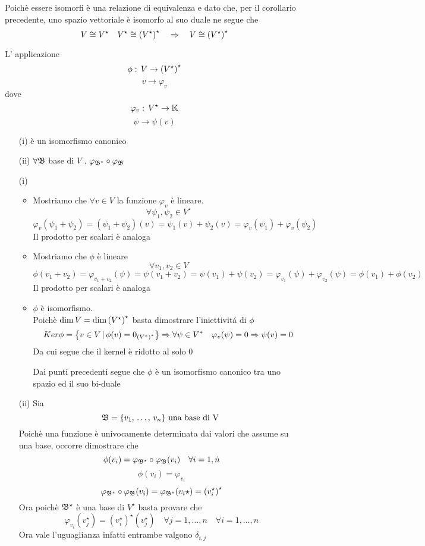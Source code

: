 \begin{oss} Poich\`e essere isomorfi \`e una relazione di equivalenza e dato che, per il corollario precedente, uno spazio vettoriale \`e isomorfo al suo duale ne segue che 
$$ V \cong V^\star  \quad V^\star \cong \left( V^\star \right)^\star \quad\Rightarrow \quad V \cong \left( V^\star \right)^\star$$
\end{oss}
\begin{prop} L' applicazione 
$$ \phi: \, V \to \left( V^\star \right)^\star$$
$$ v \to \varphi_v $$
dove
$$ \varphi_v:\, V^\star \to \mathbb{K} $$
$$ \psi \to \psi(v)$$
\begin{itemize}
\item[(i)]\`e un isomorfismo canonico
\item[(ii)] $\forall \mathfrak{B}$ base di $V$ , $ \varphi_{\mathfrak{B}^*} \circ \varphi_{\mathfrak{B}}$
\end{itemize}
\proof  \bianco\begin{itemize}
\item[(i)]
\begin{itemize}


\item Mostriamo che $\forall v \in V $ la funzione $\varphi_v$ \`e lineare. 
$$ \forall\psi_1, \psi_2 \in V^\star $$ $$\varphi_v( \psi_1 + \psi_2)=(\psi_1+\psi_2)(v)=\psi_1(v)+ \psi_2(v)=\varphi_v(\psi_1) + \varphi_v(\psi_2) $$
Il prodotto per scalari \`e analoga
\item Mostriamo che $\phi $ \`e lineare
$$ \forall v_1, v_2 \in V $$
$$ \phi( v_1+v_2)=\varphi_{v_1+v_2}(\psi)=\psi(v_1+v_2)=\psi(v_1)+\psi(v_2) = \varphi_{v_1}(\psi)+\varphi_{v_2}(\psi)=\phi(v_1)+\phi(v_2)$$
Il prodotto per scalari \`e analoga
\item $\phi$ \`e isomorfismo.\\
Poich\`e $\dim V= \dim \left( V^\star \right)^\star$ basta dimostrare l'iniettivit\'a di $\phi$
$$Ker \phi=\big\{ v \in V \, \vert \, \phi(v)=0_{ \left( V^* \right) ^* }  \big \} \Rightarrow \forall \psi \in V^* \quad \varphi_v ( \psi )=0 \Rightarrow \psi(v)=0$$
Da cui segue che il kernel \`e ridotto al solo 0 

Dai punti precedenti segue che $\phi$ \`e un isomorfismo canonico tra uno spazio ed il suo bi-duale
\end{itemize}
\item[(ii)]
Sia 
$$ \mathfrak{B}= \{ v_1, \, \dots , \, v_n \} \text{ una base di V } $$
Poich\`e una funzione \`e univocamente determinata dai valori che assume su una base, occorre dimostrare che
$$ \phi(v_i ) = \varphi_{\mathfrak{B}^\star} \circ \varphi_{\mathfrak{B}} (v_i)   \quad \forall i = 1, \dot n $$
$$ \phi(v_i) = \varphi_{v_i}$$
$$ \varphi_{\mathfrak{B}^\star} \circ \varphi_{\mathfrak{B}} (v_i)= \varphi_{\mathfrak{B}^\star} (v_i \star )= \left( v_i ^\star \right)^\star$$
Ora poich\`e $\mathfrak{B}^\star$ \`e una base di $V^\star $ basta provare che 
$$ \varphi_{v_i} (v_j^\star ) = \left( v_i ^\star \right)^\star (v_j^\star) \quad \forall j=1,\dots , n \quad \forall i =1,\dots, n $$
Ora vale l'uguaglianza infatti entrambe valgono $\delta_{i,j}$
\end{itemize}
\endproof 
\end{prop}
\newpage

